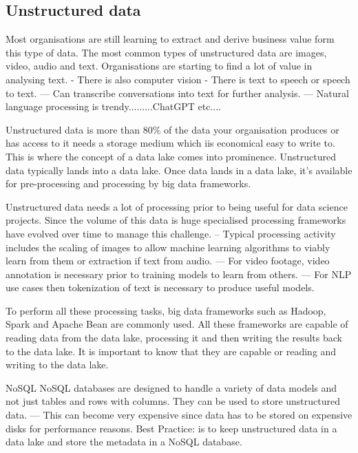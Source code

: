 \documentclass[a4paper, 11pt]{article}
\begin{document}
    \subsection{Unstructured data}
    Most organisations are still learning to extract and derive business value form this type of data.
    The most common types of unstructured data are images, video, audio and text.
    Organisations are starting to find a lot of value in analysing text.
    - There is also computer vision
    - There is text to speech or speech to text.
    --- Can transcribe conversations into text for further analysis.
    --- Natural language processing is trendy.........ChatGPT etc....

    Unstructured data is more than 80\% of the data your organisation produces or has access to it needs a storage medium which iis economical easy to write to.
    This is where the concept of a data lake comes into prominence.
    Unstructured data typically lands into a data lake.
    Once data lands in a data lake, it's available for pre-processing and processing by big data frameworks.

    Unstructured data needs a lot of processing prior to being useful for data science projects.
    Since the volume of this data is huge specialised processing frameworks have evolved over time to manage this challenge.
    -- Typical processing activity includes the scaling of images to allow machine learning algorithms to viably learn from them or extraction if text from audio.
    --- For video footage, video annotation is necessary prior to training models to learn from others.
    --- For NLP use cases then tokenization of text is necessary to produce useful models.

    To perform all these processing tasks, big data frameworks such as Hadoop, Spark and Apache Bean are commonly used.
    All these frameworks are capable of reading data from the data lake, processing it and then writing the results back to the data lake.
    It is important to know that they are capable or reading and writing to the data lake.

    NoSQL
    NoSQL databases are designed to handle a variety of data models and not just tables and rows with columns.
    They can be used to store unstructured data.
    --- This can become very expensive since data has to be stored on expensive disks for performance reasons.
    Best Practice: is to keep unstructured data in a data lake and store the metadata in a NoSQL database.
\end{document}
